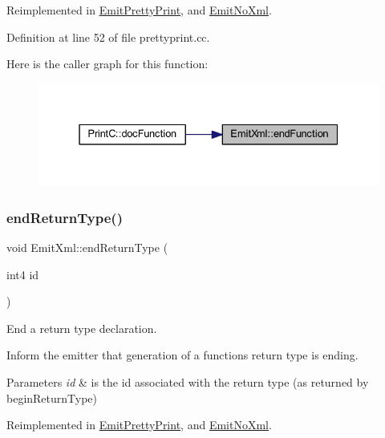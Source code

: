 Reimplemented in \mbox{\hyperlink{class_emit_pretty_print_a191b3722b5a08d9650dc7dc1216eac9d}{Emit\+Pretty\+Print}}, and \mbox{\hyperlink{class_emit_no_xml_a1d592e201a320b55d3924aa676d0b1b6}{Emit\+No\+Xml}}.



Definition at line 52 of file prettyprint.\+cc.

Here is the caller graph for this function\+:
\nopagebreak
\begin{figure}[H]
\begin{center}
\leavevmode
\includegraphics[width=331pt]{class_emit_xml_ac1cfefc98a7cfbfa0c479cac8a1e2a71_icgraph}
\end{center}
\end{figure}
\mbox{\label{class_emit_xml_af7f778b3b2111e793d6ffd73017209f9}} 
\subsubsection{\texorpdfstring{endReturnType()}{endReturnType()}}
{\footnotesize\ttfamily void Emit\+Xml\+::end\+Return\+Type (\begin{DoxyParamCaption}\item[{int4}]{id }\end{DoxyParamCaption})\hspace{0.3cm}{\ttfamily [virtual]}}



End a return type declaration. 

Inform the emitter that generation of a function\textquotesingle{}s return type is ending. 
\begin{DoxyParams}{Parameters}
{\em id} & is the id associated with the return type (as returned by begin\+Return\+Type) \\
\hline
\end{DoxyParams}


Reimplemented in \mbox{\hyperlink{class_emit_pretty_print_a4ea26b7a3fad1f933665392fa682f4b1}{Emit\+Pretty\+Print}}, and \mbox{\hyperlink{class_emit_no_xml_a6183514c884bc929fbcde10449db6096}{Emit\+No\+Xml}}.



